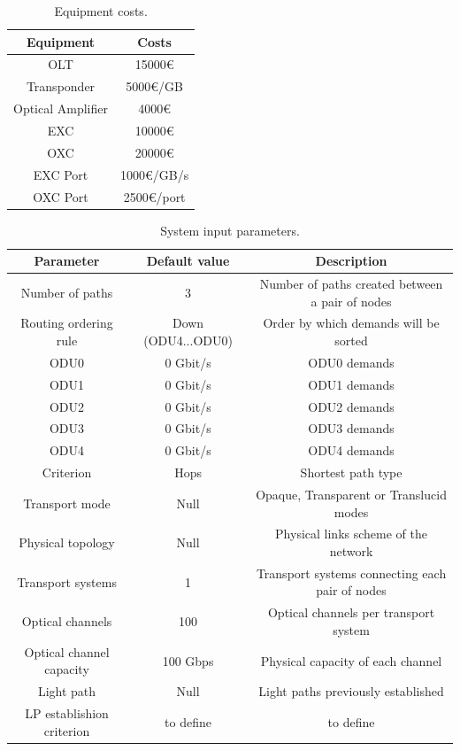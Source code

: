 \begin{table}[H]
	\centering
	\begin{tabular}{|c|c|}
		\hline
		Equipment         & Costs      \\ \hline
		OLT               & 15000\euro     \\ \hline
		Transponder       & 5000\euro/GB   \\ \hline
		Optical Amplifier & 4000\euro      \\ \hline
		EXC               & 10000\euro     \\ \hline
		OXC               & 20000\euro     \\ \hline
		EXC Port          & 1000\euro/GB/s \\ \hline
		OXC Port          & 2500\euro/port \\ \hline
	\end{tabular}
\caption{Equipment costs.}
\label{equipment_costs}
\end{table}



\begin{table}[H]
	\centering
	\begin{tabular}{| c | c | c |}
		\hline
		Parameter & Default value & Description \\
		\hline
		Number of paths & 3 & Number of paths created between a pair of nodes  \\ \hline
		Routing ordering rule & Down (ODU4...ODU0) & Order by which demands will be sorted  \\ \hline
		ODU0 & 0 Gbit/s & ODU0 demands  \\ \hline
		ODU1 & 0 Gbit/s & ODU1 demands  \\ \hline
		ODU2 & 0 Gbit/s & ODU2 demands  \\ \hline
		ODU3 & 0 Gbit/s & ODU3 demands  \\ \hline
		ODU4 & 0 Gbit/s & ODU4 demands  \\ \hline
		Criterion & Hops & Shortest path type \\ \hline
		Transport mode & Null & Opaque, Transparent or Translucid modes
		 \\ \hline
		Physical topology & Null & Physical links scheme of the network  \\ \hline
		Transport systems & 1 & Transport systems connecting each pair of nodes  \\ \hline
		Optical channels & 100 & Optical channels per transport system\\ \hline
		Optical channel capacity & 100 Gbps & Physical capacity of each channel\\ \hline
		Light path	& Null & Light paths previously established \\ \hline
		LP establishion criterion & to define & to define \\ \hline
	\end{tabular}
	\caption{System input parameters.}
	\label{system_input}
\end{table}

